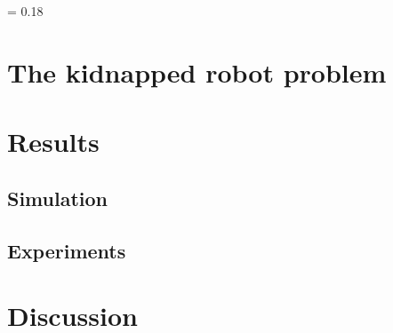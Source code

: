 \documentclass[12pt,a4paper]{article}
\newcommand*{\titleM}{
\thispagestyle{empty}
\newlength{\drop}
\begingroup%


\drop = 0.18\textheight
\centering
\vspace*{\drop}
\vspace*{\drop}
{\Huge\bfseries \ass}\\[\baselineskip]
{\large\scshape \name}\par
\vfill
\vspace*{2\drop}
\endgroup

\thispagestyle{empty}
\makebox[\textwidth]{}
\pagebreak
\makebox[\textwidth]{}
\setcounter{page}{1}
}
\begin{document}
	\titleM
	
	
	
	
	
			
	
	
	
		
	\section{The kidnapped robot problem}
	
		
		
		
 	
 	\section{Results}
 	
 		\subsection{Simulation}
 		
 		\subsection{Experiments}
 		
 	\section{Discussion}
 
 
 
 \printbibliography
 
 
 		 	
	 	
\end{document}
